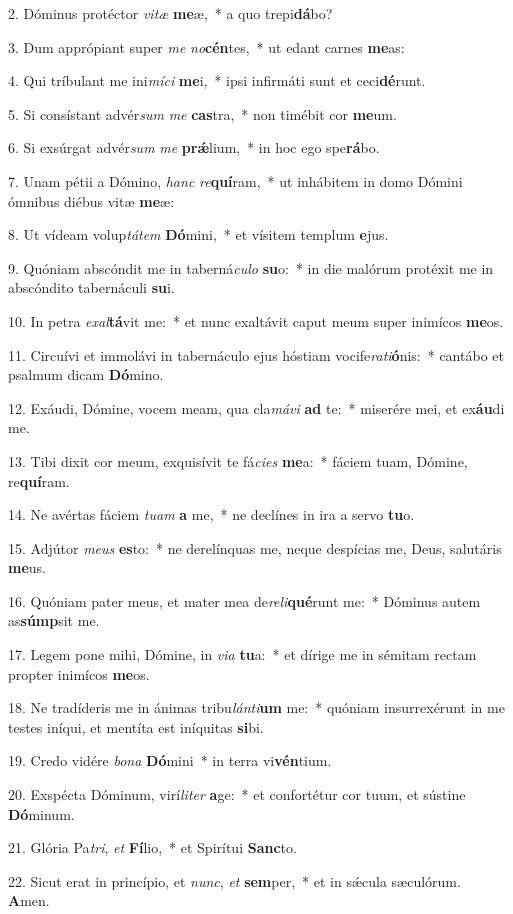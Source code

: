 2. Dóminus protéctor \textit{vi}\textit{tæ} \textbf{me}æ,~*  a quo trepi\textbf{dá}bo?\

3. Dum apprópiant super \textit{me} \textit{no}\textbf{cén}tes,~*  ut edant carnes \textbf{me}as:\

4. Qui tríbulant me ini\textit{mí}\textit{ci} \textbf{me}i,~*  ipsi infirmáti sunt et ceci\textbf{dé}runt.\

5. Si consístant advér\textit{sum} \textit{me} \textbf{cas}tra,~*  non timébit cor \textbf{me}um.\

6. Si exsúrgat advér\textit{sum} \textit{me} \textbf{prǽ}lium,~*  in hoc ego spe\textbf{rá}bo.\

7. Unam pétii a Dómino, \textit{hanc} \textit{re}\textbf{quí}ram,~*  ut inhábitem in domo Dómini ómnibus diébus vitæ \textbf{me}æ:\

8. Ut vídeam volup\textit{tá}\textit{tem} \textbf{Dó}mini,~*  et vísitem templum \textbf{e}jus.\

9. Quóniam abscóndit me in taberná\textit{cu}\textit{lo} \textbf{su}o:~*  in die malórum protéxit me in abscóndito tabernáculi \textbf{su}i.\

10. In petra \textit{ex}\textit{al}\textbf{tá}vit me:~*  et nunc exaltávit caput meum super inimícos \textbf{me}os.\

11. Circuívi et immolávi in tabernáculo ejus hóstiam vocife\textit{ra}\textit{ti}\textbf{ó}nis:~*  cantábo et psalmum dicam \textbf{Dó}mino.\

12. Exáudi, Dómine, vocem meam, qua cla\textit{má}\textit{vi} \textbf{ad} te:~*  miserére mei, et ex\textbf{áu}di me.\

13. Tibi dixit cor meum, exquisívit te fá\textit{ci}\textit{es} \textbf{me}a:~*  fáciem tuam, Dómine, re\textbf{quí}ram.\

14. Ne avértas fáciem \textit{tu}\textit{am} \textbf{a} me,~*  ne declínes in ira a servo \textbf{tu}o.\

15. Adjútor \textit{me}\textit{us} \textbf{es}to:~*  ne derelínquas me, neque despícias me, Deus, salutáris \textbf{me}us.\

16. Quóniam pater meus, et mater mea de\textit{re}\textit{li}\textbf{qué}runt me:~*  Dóminus autem as\textbf{súmp}sit me.\

17. Legem pone mihi, Dómine, in \textit{vi}\textit{a} \textbf{tu}a:~*  et dírige me in sémitam rectam propter inimícos \textbf{me}os.\

18. Ne tradíderis me in ánimas tribu\textit{lán}\textit{ti}\textbf{um} me:~*  quóniam insurrexérunt in me testes iníqui, et mentíta est iníquitas \textbf{si}bi.\

19. Credo vidére \textit{bo}\textit{na} \textbf{Dó}mini~*  in terra vi\textbf{vén}tium.\

20. Exspécta Dóminum, virí\textit{li}\textit{ter} \textbf{a}ge:~*  et confortétur cor tuum, et sústine \textbf{Dó}minum.\

21. Glória Pa\textit{tri}, \textit{et} \textbf{Fí}lio,~*  et Spirítui \textbf{Sanc}to.\

22. Sicut erat in princípio, et \textit{nunc}, \textit{et} \textbf{sem}per,~*  et in sǽcula sæculórum. \textbf{A}men.\

